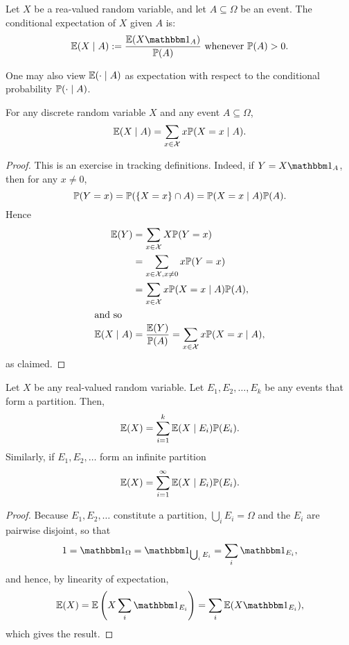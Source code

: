 \documentclass[10pt, a4paper]{article}
\begin{document}
\begin{definition}
    Let $X$ be a rea-valued random variable,
    and let $A \subseteq \Omega$ be an event.
    The conditional expectation of $X$ given $A$ is:
    \[
    \E(X \mid A) := \frac{\E(X\ind)}{\P(A)}\text{ whenever $\P(A) > 0$}.
    \]
\end{definition}

One may also view $\E(\cdot\mid A)$ as expectation with respect to the conditional probability $\P(\cdot\mid A)$.
\begin{theorem}
    For any discrete random variable $X$ and any event $A \subseteq \Omega$,
    \[
    \E(X\mid A) = \sum_{x \in \mathcal{X}}x\P(X = x\mid A).
    \]
    \begin{proof}
        This is an exercise in tracking definitions.
        Indeed,
        if $Y = X\ind$,
        then for any $x \neq 0$,
        \[
        \P(Y = x) = \P(\{X = x\} \cap A) = \P(X = x\mid A)\P(A).
        \]
        Hence
        \begin{align*}
            \E(Y) &= \sum_{x \in \mathcal{X}}X\P(Y = x) \\
            &= \sum_{x \in \mathcal{X}, x \neq 0}x\P(Y = x) \\
            &= \sum_{x \in \mathcal{X}}x\P(X = x\mid A)\P(A), \\
            \intertext{and so}
            \E(X \mid A) &= \frac{\E(Y)}{\P(A)} = \sum_{x \in \mathcal{X}}x\P(X = x\mid A),
        \end{align*}
        as claimed.
    \end{proof}
\end{theorem}

\begin{theorem}\label{pre_prob_thm_partthmforexp}
    Let $X$ be any real-valued random variable.
    Let $E_1, E_2, \dotsc, E_k$ be any events that form a partition.
    Then,
    \[
    \E(X) = \sum_{i = 1}^{k}\E(X \mid E_i)\P(E_i).
    \]
    Similarly,
    if $E_1, E_2, \dotsc$ form an infinite partition
    \[
    \E(X) = \sum_{i = 1}^{\infty}\E(X \mid E_i)\P(E_i).
    \]
    \begin{proof}
        Because $E_1, E_2, \dotsc$ constitute a partition,
        $\bigcup_iE_i = \Omega$ and the $E_i$ are pairwise disjoint,
        so that
        \[
        1 = \ind[\Omega] = \ind[\bigcup_iE_i] = \sum_{i}\ind[E_i],
        \]
        and hence,
        by linearity of expectation,
        \[
        \E(X) = \E\left(X\sum_{i}\ind[E_i]\right) = \sum_{i}\E(X\ind[E_i]),
        \]
        which gives the result.
    \end{proof}
\end{theorem}
\end{document}

